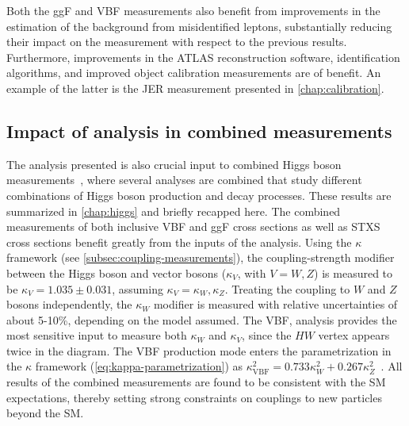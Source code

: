 Both the ggF and VBF measurements also benefit from improvements in the estimation of the background from misidentified leptons, substantially reducing their impact on the measurement with respect to the previous results. 
Furthermore, improvements in the ATLAS reconstruction software, identification algorithms, and improved object calibration measurements are of benefit. 
An example of the latter is the JER measurement presented in \cref{chap:calibration}. 

\subsection{Impact of analysis in combined measurements}
The analysis presented is also crucial input to combined Higgs boson measurements~\cite{NaturePaper}, where several analyses are combined that study different combinations of Higgs boson production and decay processes. These results are summarized in \cref{chap:higgs} and briefly recapped here.
The combined measurements of both inclusive VBF and ggF cross sections as well as STXS cross sections benefit greatly from the inputs of the \HWW analysis.
Using the $\kappa$ framework (see \cref{subsec:coupling-measurements}), the coupling-strength modifier between the Higgs boson and vector bosons ($\kappa_V$, with $V = W, Z$) is measured to be $\kappa_{V} = 1.035 \pm 0.031$, assuming $\kappa_V = \kappa_W, \kappa_Z$.
Treating the coupling to $W$ and $Z$ bosons independently, the $\kappa_W$ modifier is measured with relative uncertainties of about 5-10\%, depending on the model assumed. 
The VBF, \HWW analysis provides the most sensitive input to measure both $\kappa_W$ and $\kappa_V$, since the $HW$ vertex appears twice in the diagram. The VBF production mode enters the parametrization in the $\kappa$ framework (\cref{eq:kappa-parametrization}) as $\kappa_\mathrm{VBF}^2 = 0.733 \kappa^2_W + 0.267 \kappa^2_Z$~\cite{NaturePaper}. 
All results of the combined measurements are found to be consistent with the SM expectations, thereby setting strong constraints on couplings to new particles beyond the SM.  

